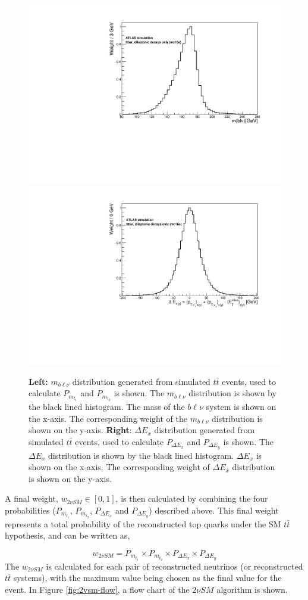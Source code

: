 \begin{figure}[h!]
	\includegraphics[width=0.45\linewidth]{figures/mtop_2vSM.pdf}
	\includegraphics[width=0.45\linewidth]{figures/DExy_2vSM.pdf}
	\centering
	\caption{\textbf{Left:} $m_{b\ell\nu}$ distribution generated from simulated $t\bar{t}$ events, used to calculate $P_{m_{t_{1}}}$ and $P_{m_{t_{2}}}$ is shown. The $m_{b\ell\nu}$ distribution is shown by the black lined histogram. The mass of the $b\ell\nu$ system is shown on the x-axis. The corresponding weight of the $m_{b\ell\nu}$ distribution is shown on the y-axis. \textbf{Right}: $\Delta E_{x}$ distribution generated from simulated $t\bar{t}$ events, used to calculate $P_{\Delta E_{x}}$ and $P_{\Delta E_{y}}$ is shown. The $\Delta E_{x}$ distribution is shown by the black lined histogram. $\Delta E_{x}$ is shown on the x-axis. The corresponding weight of $\Delta E_{x}$ distribution is shown on the y-axis. }
	\label{fig:2vSM-mass-dist}
\end{figure}

A final weight, $w_{2\nu SM} \in [0,1]$, is then calculated by combining the four probabilities ($P_{m_{t_{1}}}$, $P_{m_{t_{2}}}$, $P_{\Delta E_{x}}$ and $P_{\Delta E_{y}}$) described above. This final weight represents a total probability of the reconstructed top quarks under the SM $t\bar{t}$ hypothesis, and can be written as,

\begin{equation}
    w_{2\nu SM} = P_{m_{t_{1}}} \times P_{m_{t_{2}}} \times P_{\Delta E_{x}} \times P_{\Delta E_{y}}
\end{equation}
The $w_{2\nu SM}$ is calculated for each pair of reconstructed neutrinos (or reconstructed $t\bar{t}$ systems), with the maximum value being chosen as the final value for the event. In Figure \ref{fig:2vsm-flow}, a flow chart of the $2\nu SM$ algorithm is shown.


